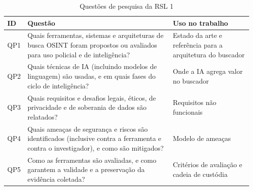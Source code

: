 \begin{table}[htbp]
	\centering
	\caption{Questões de pesquisa da RSL 1}
	\label{tab:qp-rsl1}
	\small
	\begin{tabular}{p{0.9cm}p{9.2cm}>{\raggedright\arraybackslash}p{4.2cm}}
		\hline
		\textbf{ID} & \textbf{Questão} & \textbf{Uso no trabalho} \\
		\hline
		QP1 & Quais ferramentas, sistemas e arquiteturas de busca OSINT foram
		propostos ou avaliados para uso policial e de inteligência? &
		Estado da arte e referência para a arquitetura do buscador \\
		\hline
		QP2 & Quais técnicas de IA (incluindo modelos de linguagem) são
		usadas, e em quais fases do ciclo de inteligência? &
		Onde a IA agrega valor no buscador \\
		\hline
		QP3 & Quais requisitos e desafios legais, éticos, de privacidade e de
		soberania de dados são relatados? &
		Requisitos não funcionais \\
		\hline
		QP4 & Quais ameaças de segurança e riscos são identificados
		(inclusive contra a ferramenta e contra o investigador), e como são
		mitigados? &
		Modelo de ameaças \\
		\hline
		QP5 & Como as ferramentas são avaliadas, e como garantem a validade e
		a preservação da evidência coletada? &
		Critérios de avaliação e cadeia de custódia \\
		\hline
	\end{tabular}
\end{table}

